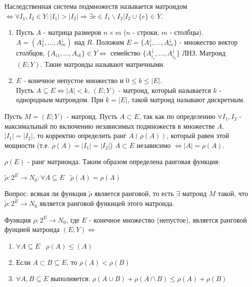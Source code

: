 \oprk Наследственная система подмножеств называется матроидом $\Leftrightarrow \forall I_1,I_2 \in Y : |I_1|>|I_2| \Rightarrow \exists e \in I_1 \backslash I_2 | I_2 \cup \{ e \} \in Y$.\\

\examplei
\begin{enumerate}
\item Пусть $A$ - матрица размеров $n \times m$ ($n$ - строки, $m$ - столбцы).
$A = (A^{\downarrow}_1, \ldots , A^{\downarrow}_m)$ над $R$. Положим $ E = \{ A^{\downarrow}_1,\ldots,A^{\downarrow}_m \}$ - множество вектор столбцов, $ \{ A_{i1}, \ldots, A_{ik} \} \in Y \Leftrightarrow$ семейство $ \{ A^{\downarrow}_{i_1}, \ldots, A^{\downarrow}_{i_k} \} $ ЛНЗ.
Матроид $(E;Y)$. Такие матроиды называют матричными. 

\item $E$ - конечное непустое множество и $0 \leqslant k \leqslant |E|$. \\Пусть $A \subseteq E \Leftrightarrow |A| < k $. $ (E;Y) $ - матроид, который называется  $k$ - однородным матроидом. При $k = |E|$, такой матроид называют дискретным. 
\end{enumerate}

\opr Пусть $M = (E;Y)$ - матроид. Пусть $ A \subset E$, так как по определению $\forall I_1,I_2$ - максимальный по включению независимых подмножеств в множестве $A$. $|I_1| = |I_2|$, то корректно определить ранг $A(\rho(A))$, который равен этой мощности (т.е. $\rho(A) = |I_1| = |I_2|$) $A \subset E $ независимо  $\Leftrightarrow |A| = \rho(A).$\par$ \rho(E) $ - ранг матриоида. Таким образом определена ранговая функция:\par
$\tilde{\rho}:2^E \rightarrow N_0 : \forall A \subseteq E \;\;\; \tilde\rho(A) = \rho(A)$

Вопрос: всякая ли функция $\tilde\rho$ является ранговой, то есть $\exists$ матроид $M$ такой, что $\tilde\rho:2^E \rightarrow N_0$ является ранговой функицей этого матроида.

\thr Функция $\rho : 2^E \rightarrow N_0$, где $E$ - конечное множество (непустое), является ранговой фунцией матроида $(E;Y) \Leftrightarrow$
\begin{enumerate}
\item $\forall A \subseteq E \;\;\;  \rho(A) \leqslant (A)$
\item Если $ A \subset B \subseteq E$, то $\rho(A) < \rho(B)$
\item $\forall A,B \subseteq E$ выполняется:
$\rho(A \cup B) + \rho(A \cap B) \leqslant \rho(A) + \rho(B)$
\end{enumerate} 

